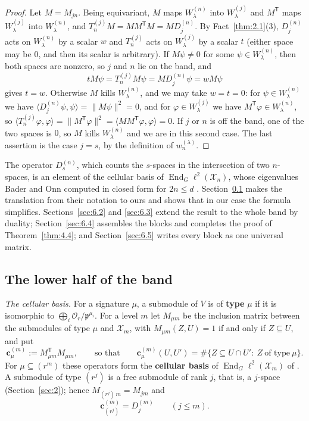 \documentclass[11pt]{article}
\numberwithin{equation}{section}
\theoremstyle{plain}
\theoremstyle{definition}
\begin{document}
\begin{proof}
Let $M=M_{jn}$. Being equivariant, $M$ maps $W^{(n)}_\lambda$ into $W^{(j)}_\lambda$ and
$M^{\mathsf T}$ maps $W^{(j)}_\lambda$ into $W^{(n)}_\lambda$, and
$T^{(j)}_nM=MM^{\mathsf T}M=MD^{(n)}_{j}$. By Fact~\ref{thm:2.1}(3), $D^{(n)}_{j}$ acts on
$W^{(n)}_\lambda$ by a scalar $w$ and $T^{(j)}_n$ acts on $W^{(j)}_\lambda$ by a scalar $t$
(either space may be $0$, and then its scalar is arbitrary). If $M\psi\ne0$ for some
$\psi\in W^{(n)}_\lambda$, then both spaces are nonzero, so $j$ and $n$ lie on the band, and
\[
tM\psi=T^{(j)}_nM\psi=MD^{(n)}_{j}\psi=wM\psi
\]
gives $t=w$. Otherwise $M$ kills $W^{(n)}_\lambda$, and we may take $w=t=0$: for
$\psi\in W^{(n)}_\lambda$ we have
$\langle D^{(n)}_{j}\psi,\psi\rangle=\lVert M\psi\rVert^2=0$, and for
$\varphi\in W^{(j)}_\lambda$ we have $M^{\mathsf T}\varphi\in W^{(n)}_\lambda$, so
$\langle T^{(j)}_n\varphi,\varphi\rangle=\lVert M^{\mathsf T}\varphi\rVert^2
=\langle MM^{\mathsf T}\varphi,\varphi\rangle=0$. If $j$ or $n$ is off the band, one of the
two spaces is $0$, so $M$ kills $W^{(n)}_\lambda$ and we are in this second case. The last
assertion is the case $j=s$, by the definition of $w^{(\lambda)}_n$.
\end{proof}

The operator $D^{(n)}_{s}$, which counts the $s$-spaces in the intersection of
two $n$-spaces, is an element of the cellular basis of $\operatorname{End}_G\ell^2(\mathcal{X}_n)$,
whose eigenvalues Bader and Onn computed in closed form for $2n\le d$ \cite{BO12}.
Section~\ref{sec:6.1} makes the translation from their notation to ours and shows that in our case the formula simplifies.
Sections~\ref{sec:6.2} and \ref{sec:6.3} extend the result to the whole
band by duality; Section~\ref{sec:6.4} assembles the blocks and completes the proof of
Theorem~\ref{thm:4.4}; and Section~\ref{sec:6.5} writes every block as one universal
matrix.

\subsection{The lower half of the band}\label{sec:6.1}

\emph{The cellular basis.} For a signature $\mu$, a submodule of $V$
is of \textbf{type} $\mu$ if it is isomorphic to $\bigoplus_i\mathcal{O}_r/\mathfrak{p}^{\mu_i}$.
For a level $m$ let $M_{\mu m}$ be the inclusion matrix between the submodules of type
$\mu$ and $\mathcal{X}_m$, with $M_{\mu m}(Z,U)=1$ if and only if $Z\subseteq U$, and put
\[
\mathbf c^{(m)}_\mu:=M_{\mu m}^{\mathsf T}M_{\mu m},\qquad\text{so that}\qquad
\mathbf c^{(m)}_\mu(U,U')=\#\{Z\subseteq U\cap U':\ Z\ \text{of type}\ \mu\}.
\]
For $\mu\subseteq(r^m)$ these operators form the \textbf{cellular basis} of
$\operatorname{End}_G\ell^2(\mathcal{X}_m)$ of \cite{BO12}. A submodule of type $(r^j)$ is a free
submodule of rank $j$, that is, a $j$-space (Section~\ref{sec:2}); hence
$M_{(r^j)\,m}=M_{jm}$ and
\begin{equation}\label{eq:6.1}
\mathbf c^{(m)}_{(r^j)}=D^{(m)}_j\qquad(j\le m).
\end{equation}
\end{document}

